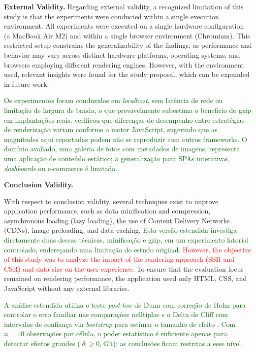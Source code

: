 \documentclass{sbc2019}%
\newcommand{\todo}[1]{\textcolor{red}{#1}}
\begin{document}
\textbf{External Validity.}
Regarding external validity, a recognized limitation of this study is that the experiments were conducted within a single execution environment. All experiments were executed on a single hardware configuration (a MacBook Air M2) and within a single browser environment (Chromium). This restricted setup constrains the generalizability of the findings, as performance and behavior may vary across distinct hardware platforms, operating systems, and browsers employing different rendering engines. However, with the environment used, relevant insights were found for the study proposal, which can be expanded in future work.

\textcolor{darkgreen}{Os experimentos foram conduzidos em \textit{localhost}, sem latência de rede ou limitação de largura de banda, o que provavelmente subestima o benefício do gzip em implantações reais. \citet{ollila:2021} verificou que diferenças de desempenho entre estratégias de renderização variam conforme o motor JavaScript, sugerindo que as magnitudes aqui reportadas podem não se reproduzir com outros frameworks. O domínio avaliado, uma galeria de fotos com metadados de imagens, representa uma aplicação de conteúdo estático; a generalização para SPAs interativas, \textit{dashboards} ou e-commerce é limitada \cite{gangishetti:2026}.}

\textbf{Conclusion Validity.}

With respect to conclusion validity, several techniques exist to improve application performance, such as data minification and compression, asynchronous loading (lazy loading), the use of Content Delivery Networks (CDNs), image preloading, and data caching. \textcolor{darkgreen}{Esta versão estendida investiga diretamente duas dessas técnicas, minificação e gzip, em um experimento fatorial controlado, endereçando uma limitação do estudo original.} \todo{However, the objective of this study was to analyze the impact of the rendering approach (SSR and CSR) and data size on the user experience.} To ensure that the evaluation focus remained on rendering performance, the application used only HTML, CSS, and JavaScript without any external libraries.

\textcolor{darkgreen}{A análise estendida utiliza o teste \textit{post-hoc} de Dunn com correção de Holm para controlar o erro familiar nas comparações múltiplas \cite{book:wohlin} e o Delta de Cliff com intervalos de confiança via \textit{bootstrap} para estimar o tamanho de efeito \cite{efron:1994,Kitchenham2024}. Com $n = 10$ observações por célula, o poder estatístico é suficiente apenas para detectar efeitos grandes ($|\delta| \geq 0{,}474$); as conclusões ficam restritas a esse nível.}
\end{document}
